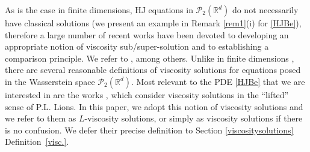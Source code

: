 \documentclass[reqno,11pt]{amsart}
\numberwithin{equation}{section}
\newcommand{\R}{\mathbb{R}} %
\newcommand{\nd}{\noindent}
\begin{document}
    \nd
    As is the case in finite dimensions, HJ equations in $\mathcal{P}_2(\R^d)$ do not necessarily have classical solutions (we present an example in Remark \ref{rem1}(i) for \eqref{HJBe}), therefore a large number of recent works have been devoted to developing an appropriate notion of viscosity sub/super-solution and to establishing a comparison principle. We refer to \cite{conforti2023hamilton,daudin2024comparison,bayraktarqiu2025viscosity,bayraktar2025comparison,BayraktarEkrenHeZhang2025SC,cheung2025viscosity,daudin2025well,zhou2024viscosity, soner2024viscosity,mete2023viscosity, bertucci2024stochastic}, among others. Unlike in finite dimensions \cite{crandall1992user}, there are several reasonable definitions of viscosity solutions for equations posed in the Wasserstein space $\mathcal{P}_2(\R^d)$. Most relevant to the PDE \eqref{HJBe} that we are interested in are the works \cite{gangbo2019differentiability,gangbo2021finite}, which consider viscosity solutions in the ``lifted'' sense of P.L. Lions.
    In this paper,  we adopt this notion of viscosity solutions and we refer to them as  $L$-viscosity solutions, or simply as viscosity solutions if there is no confusion. We defer their precise definition to Section \ref{viscositysolutions} Definition~\ref{visc.}.
    \vspace{2mm}
\end{document}
